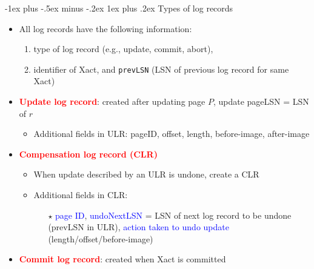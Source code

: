 \documentclass[10pt,landscape]{article}
\makeatletter
\newcommand{\subsubsubsection}{\@startsection{subsubsection}{3}{0mm}%
                                {-1ex plus -.5ex minus -.2ex}%
                                {1ex plus .2ex}%
                                {\normalfont\scriptsize\bfseries}}
\newcommand{\1}{\mathmybb{1}}
\makeatother
\begin{document}
\begin{multicols*}{3}
\subsubsubsection{Types of log records}
\begin{itemize}
    \item All log records have the following information:
    \begin{enumerate}
        \item type of log record (e.g., update, commit, abort),
        \item identifier of Xact, and \texttt{prevLSN} (LSN of previous log record for same Xact)
    \end{enumerate}
    \item \textcolor{red}{\textbf{Update log record}}: created after updating page $P$, update pageLSN = LSN of $r$
    \begin{itemize}
        \item Additional fields in ULR: pageID, offset, length, before-image, after-image
    \end{itemize}
    \item \textcolor{red}{\textbf{Compensation log record (CLR)}}
    \begin{itemize}
        \item When update described by an ULR is undone, create a CLR
        \item Additional fields in CLR:
        \begin{itemize}
            \item[$\star$] \textcolor{blue}{page ID}, \textcolor{blue}{undoNextLSN} = LSN of next log record to be undone (prevLSN in ULR), \textcolor{blue}{action taken to undo update} (length/offset/before-image)
        \end{itemize}
    \end{itemize}
    \item \textcolor{red}{\textbf{Commit log record}}: created when Xact is committed

\end{itemize}
\end{multicols*}
\end{document}
